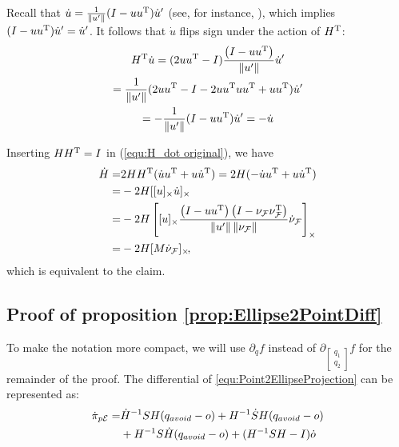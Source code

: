 \documentclass[10pt,twocolumn,twoside]{IEEEtran}
\begin{document}
    Recall that $\dot{u}=\frac{1}{\lVert u'\rVert}(I-uu^\mathrm{T})\dot{u}'$ (see, for instance, \cite{Tron:Arxiv14}), which implies $(I-uu^\mathrm{T})\dot{u}'=\dot{u}'$. It follows that $\dot{u}$ flips sign under the action of $H^\mathrm{T}$:
    \begin{multline}
      H^\mathrm{T} \dot u = (2u u^\mathrm{T}-I)\frac{ \left( I - u u^\mathrm{T} \right) } {\left\|u'\right\|} \dot u' \\
      =\frac{1}{\lVert u'\rVert} (2u u^\mathrm{T}-I-2u u^\mathrm{T} u u^\mathrm{T}+u u^\mathrm{T})\dot{u}'\\
      = -\frac{1}{\lVert u'\rVert} (I-u u^\mathrm{T})\dot u'
      = -\dot u
    \end{multline}

    Inserting $HH^\mathrm{T}=I$ in (\ref{equ:H_dot original}), we have
    \begin{equation}
      \begin{split}
        \dot H =  &  2H H^\mathrm{T}(\dot u u^\mathrm{T} + u \dot u^\mathrm{T})
        =  2 H (-\dot u u^\mathrm{T} + u \dot u^\mathrm{T})\\
        =  &  -2H [[u]_{\times} \dot u]_{\times} \\
        = &  -2 H \left[ [u]_{\times}  \frac{ \left( I - u u^\mathrm{T} \right) \left( I- \nu_{\mathcal{F}} \nu_{\mathcal{F}}^\mathrm{T} \right)} {\left\|u'\right\| \left\|\nu_{\mathcal{F}}\right\|} \dot{\nu}_{\mathcal{F}}\right]_{\times}\\
        = & -2 H [M \dot{\nu}_{\mathcal{F}}]_{\times}\!,
      \end{split}
    \end{equation}
    which is equivalent to the claim.
  
  \subsection{Proof of proposition \ref{prop:Ellipse2PointDiff}}\label{proof:Ellipse2PointDiff}
      To make the notation more compact, we will use $\partial_q f$ instead of $\partial_{\left[\begin{smallmatrix}q_1\\q_2\end{smallmatrix}\right]} f$ for the remainder of the proof.
    The differential of \eqref{equ:Point2EllipseProjection} can be represented as:
    \begin{equation}\label{equ:dPi_dt}
      \begin{split}
        \dot \pi_{p\mathcal{E}} = &  \dot H^{-1}SH (q_{avoid} - o)  + H^{-1}\dot S H (q_{avoid} - o) \\
        &+ H^{-1}S \dot H (q_{avoid} - o) + (H^{-1}SH -I)\dot o\\
      \end{split}
    \end{equation}
\end{document}
